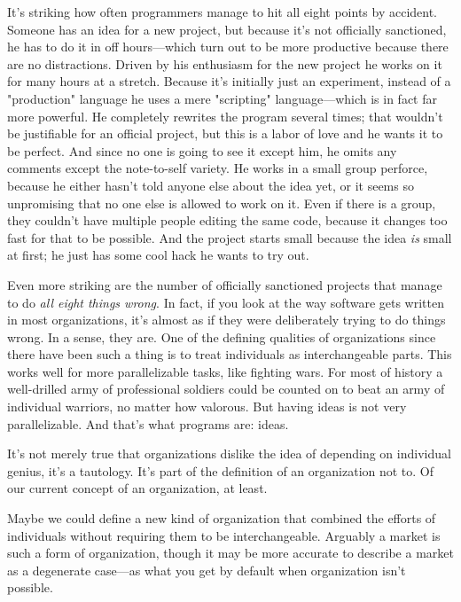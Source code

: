 It's striking how often programmers manage to hit all eight points
by accident.  Someone has an idea for a new project, but because
it's not officially sanctioned, he has to do it in off hours---which
turn out to be more productive because there are no distractions.
Driven by his enthusiasm for the new project he works on it for
many hours at a stretch.  Because it's initially just an
experiment, instead of a "production" language he uses a mere
"scripting" language---which is in fact far more powerful.  He
completely rewrites the program several times; that wouldn't be
justifiable for an official project, but this is a labor of love
and he wants it to be perfect.  And since no one is going to see
it except him, he omits any comments except the note-to-self variety.
He works in a small group perforce, because he either hasn't told
anyone else about the idea yet, or it seems so unpromising that no
one else is allowed to work on it.  Even if there is a group, they
couldn't have multiple people editing the same code, because it
changes too fast for that to be possible.  And the project starts
small because the idea \emph{is} small at first; he just has some cool
hack he wants to try out.

Even more striking are the number of officially sanctioned projects
that manage to do \emph{all eight things wrong}.  In fact, if you look at
the way software gets written in most organizations, it's almost
as if they were deliberately trying to do things wrong. In a sense,
they are.  One of the defining qualities of organizations since
there have been such a thing is to treat individuals as interchangeable
parts.  This works well for more parallelizable tasks, like fighting
wars.  For most of history a well-drilled army of professional
soldiers could be counted on to beat an army of individual warriors,
no matter how valorous.  But having ideas is not very parallelizable.
And that's what programs are: ideas.

It's not merely true that organizations dislike the idea of depending
on individual genius, it's a tautology.  It's part of the definition
of an organization not to.  Of our current concept of an organization,
at least.

Maybe we could define a new kind of organization that combined the
efforts of individuals without requiring them to be interchangeable.
Arguably a market is such a form of organization, though it may be
more accurate to describe a market as a degenerate case---as what
you get by default when organization isn't possible.

